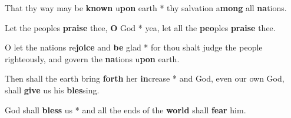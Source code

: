 \begin{multicols}{2}
	That thy way may be \textbf{known} u\textbf{pon} earth * thy salvation a\textbf{mong} all \textbf{na}tions.
	
	Let the peoples \textbf{praise} thee, \textbf{O} God * yea, let all the \textbf{peo}ples \textbf{praise} thee.
	
	O let the nations re\textbf{joice} and \textbf{be} glad * for thou shalt judge the people righteously, and govern the \textbf{na}tions u\textbf{pon} earth.
	
	Then shall the earth bring \textbf{forth} her \textbf{in}crease * and God, even our own God, shall \textbf{give} us his \textbf{bles}sing.
	
	God shall \textbf{bless} us * and all the ends of the \textbf{world} shall \textbf{fear} him.
\end{multicols}
